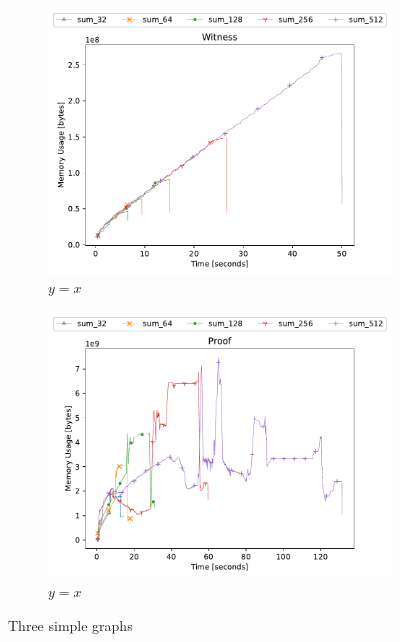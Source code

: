 \begin{figure}[h]
    \centering
    \begin{subfigure}[t]{0.49\textwidth}
        \centering
        \includegraphics[width=1\textwidth]{benchmarks/witness.pdf}
        \caption{$y=x$}
        \label{fig:y equals x}
    \end{subfigure}
    \hfill
    \begin{subfigure}[t]{0.49\textwidth}
        \centering
        \includegraphics[width=1\textwidth]{benchmarks/proof.pdf}
        \caption{$y=x$}
        \label{fig:y equals x}
    \end{subfigure}
    \caption{Three simple graphs}
    \label{fig:proving-phase}
\end{figure}


